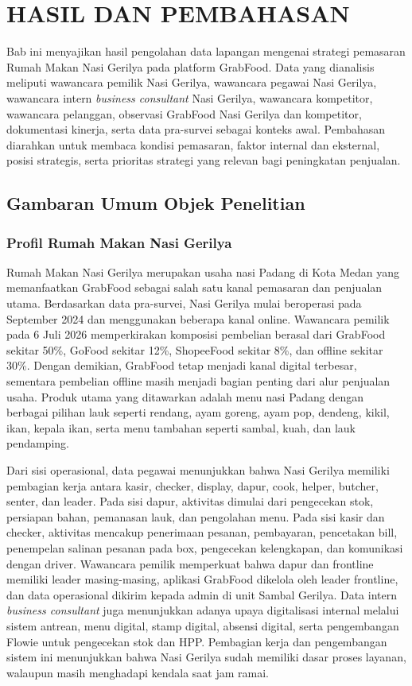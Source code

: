 \chapter{HASIL DAN PEMBAHASAN}

Bab ini menyajikan hasil pengolahan data lapangan mengenai strategi pemasaran Rumah Makan Nasi Gerilya pada platform GrabFood. Data yang dianalisis meliputi wawancara pemilik Nasi Gerilya, wawancara pegawai Nasi Gerilya, wawancara intern \textit{business consultant} Nasi Gerilya, wawancara kompetitor, wawancara pelanggan, observasi GrabFood Nasi Gerilya dan kompetitor, dokumentasi kinerja, serta data pra-survei sebagai konteks awal. Pembahasan diarahkan untuk membaca kondisi pemasaran, faktor internal dan eksternal, posisi strategis, serta prioritas strategi yang relevan bagi peningkatan penjualan.

\section{Gambaran Umum Objek Penelitian}

\subsection{Profil Rumah Makan Nasi Gerilya}
Rumah Makan Nasi Gerilya merupakan usaha nasi Padang di Kota Medan yang memanfaatkan GrabFood sebagai salah satu kanal pemasaran dan penjualan utama. Berdasarkan data pra-survei, Nasi Gerilya mulai beroperasi pada September 2024 dan menggunakan beberapa kanal online. Wawancara pemilik pada 6 Juli 2026 memperkirakan komposisi pembelian berasal dari GrabFood sekitar 50\%, GoFood sekitar 12\%, ShopeeFood sekitar 8\%, dan offline sekitar 30\%. Dengan demikian, GrabFood tetap menjadi kanal digital terbesar, sementara pembelian offline masih menjadi bagian penting dari alur penjualan usaha. Produk utama yang ditawarkan adalah menu nasi Padang dengan berbagai pilihan lauk seperti rendang, ayam goreng, ayam pop, dendeng, kikil, ikan, kepala ikan, serta menu tambahan seperti sambal, kuah, dan lauk pendamping.

Dari sisi operasional, data pegawai menunjukkan bahwa Nasi Gerilya memiliki pembagian kerja antara kasir, checker, display, dapur, cook, helper, butcher, senter, dan leader. Pada sisi dapur, aktivitas dimulai dari pengecekan stok, persiapan bahan, pemanasan lauk, dan pengolahan menu. Pada sisi kasir dan checker, aktivitas mencakup penerimaan pesanan, pembayaran, pencetakan bill, penempelan salinan pesanan pada box, pengecekan kelengkapan, dan komunikasi dengan driver. Wawancara pemilik memperkuat bahwa dapur dan frontline memiliki leader masing-masing, aplikasi GrabFood dikelola oleh leader frontline, dan data operasional dikirim kepada admin di unit Sambal Gerilya. Data intern \textit{business consultant} juga menunjukkan adanya upaya digitalisasi internal melalui sistem antrean, menu digital, stamp digital, absensi digital, serta pengembangan Flowie untuk pengecekan stok dan HPP. Pembagian kerja dan pengembangan sistem ini menunjukkan bahwa Nasi Gerilya sudah memiliki dasar proses layanan, walaupun masih menghadapi kendala saat jam ramai.

